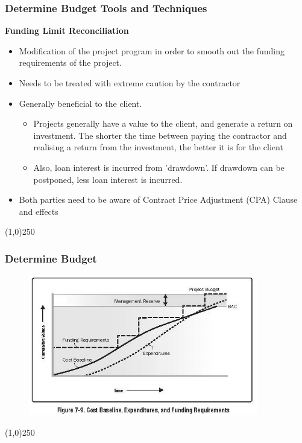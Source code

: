 \begin{frame}
\frametitle{Determine Budget \hfill\hfill Tools and Techniques }

\textbf{Funding Limit Reconciliation}\\
\begin{itemize}
	\item Modification of the project program in order to smooth out the funding requirements of the project.
	\item Needs to be treated with extreme caution by the contractor
	\item Generally beneficial to the client.
		\begin{itemize}
			\item Projects generally have a value to the client, and generate a return on investment.  The shorter the time between paying the contractor and realising a return from the investment, the better it is for the client
			\item Also, loan interest is incurred from 'drawdown'.  If drawdown can be postponed, less loan interest is incurred.
		\end{itemize}
	\item Both parties need to be aware of Contract Price Adjustment (CPA) Clause and effects
\end{itemize}
\end{frame}
\begin{center}\line(1,0){250}\end{center}






\begin{frame}
\frametitle{Determine Budget}
\begin{figure}
	\centering
		\includegraphics[width = 10cm]{images/Fig7-9.jpg}
	\label{fig:Fig7-9}
\end{figure}

\end{frame}
\begin{center}\line(1,0){250}\end{center}






